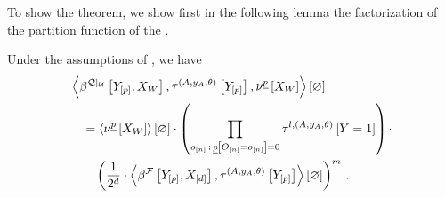 To show the theorem, we show first in the following lemma the factorization of the partition function of the \HybridFOLNetwork{}.

\begin{lemma}
    \label{lem:FOLpartitionfunctionfactorization}
    Under the assumptions of , we have
    \begin{align*}
        &\left\langle 
            \beta^{{\mathcal{Q}}|_{\mathcal{U}}}\left[Y_{[p]},X_{W}\right],\tau^{(A,y_{A},\theta)}\left[Y_{[p]}\right],\nu^{\underline{p}}\left[X_{W}\right]
        \right\rangle \left[ \varnothing \right] \\
        &\quad=\left\langle \nu^{\underline{p}}\left[X_{W}\right]\right\rangle \left[ \varnothing \right] \cdot
        \left(  \prod_{o_{[n]}\,:\,\underline{p}\left[O_{[n]}=o_{[n]}\right]=0} \tau^{l,(A,y_{A},\theta)}\left[Y=1\right]\right) \cdot \\
        &\quad\quad \left(\frac{1}{2^{d}}
        \cdot \left\langle \beta^{\mathcal{F}}\left[Y_{[p]},X_{[d]}\right],\tau^{(A,y_{A},\theta)}\left[Y_{[p]}\right]\right\rangle \left[ \varnothing \right]
        \right)^{m} \, .
    \end{align*}
\end{lemma}

